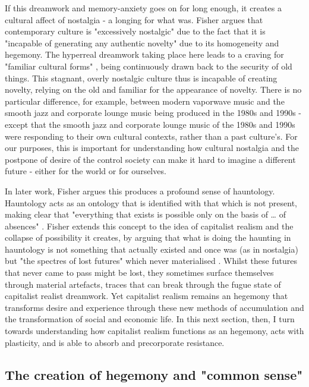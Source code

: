 If this dreamwork and memory-anxiety goes on for long enough, it creates a cultural affect of nostalgia - a longing for what was. Fisher argues that contemporary culture is "excessively nostalgic" due to the fact that it is "incapable of generating any authentic novelty" \citep[p. 63]{fisher_capitalist_2009} due to its homogeneity and hegemony. The hyperreal dreamwork taking place here leads to a craving for "familiar cultural forms" \citep[p. 63]{fisher_capitalist_2009}, being continuously drawn back to the security of old things. This stagnant, overly nostalgic culture thus is incapable of creating novelty, relying on the old and familiar for the appearance of novelty. There is no particular difference, for example, between modern vaporwave music and the smooth jazz and corporate lounge music being produced in the 1980s and 1990s - except that the smooth jazz and corporate lounge music of the 1980s and 1990s were responding to their own cultural contexts, rather than a past culture's. For our purposes, this is important for understanding how  cultural nostalgia and the postpone of desire of the control society can make it hard to imagine a different future - either for the world or for ourselves.

In later work,  Fisher argues this produces a profound sense of hauntology. Hauntology acts as an ontology that is identified with that which is not present, making clear that "everything that exists is possible only on the basis of \ldots{} of absences" \citep[p. 187]{fisher_ghosts_2014}. Fisher extends this concept to the idea of capitalist realism and the collapse of possibility it creates, by arguing that what is doing the haunting in hauntology is not something that actually existed and once was (as in nostalgia) but "the spectres of lost futures" which never materialised \citep[p. 21]{fisher_ghosts_2014}. Whilst these futures that never came to pass might be lost, they sometimes surface themselves through material artefacts, traces that can break through the fugue state of capitalist realist dreamwork. Yet capitalist realism remains an hegemony that transforms desire and experience through these new methods of accumulation and the transformation of social and economic life. In this next section, then, I turn towards understanding how capitalist realism functions as an hegemony, acts with plasticity, and is able to absorb and precorporate resistance.

\subsection{The creation of hegemony and "common sense"}
\label{subsec:the-creation-of-hegemony-and-common-sense}

